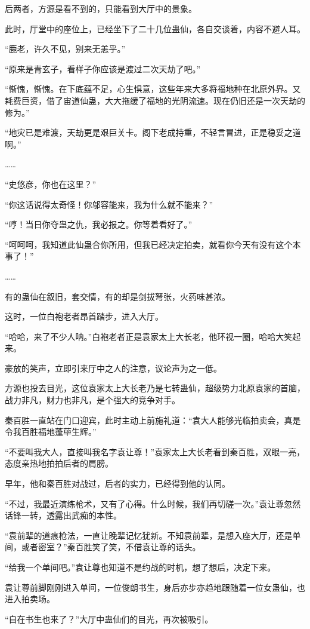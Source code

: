 \begin{this_body}
后两者，方源是看不到的，只能看到大厅中的景象。

此时，厅堂中的座位上，已经坐下了二十几位蛊仙，各自交谈着，内容不避人耳。

“鹿老，许久不见，别来无恙乎。”

“原来是青玄子，看样子你应该是渡过二次天劫了吧。”

“惭愧，惭愧。在下底蕴不足，心生惧意，这些年来大多将福地种在北原外界。又耗费巨资，借了宙道仙蛊，大大拖缓了福地的光阴流速。现在仍旧还是一次天劫的修为。”

“地灾已是难渡，天劫更是艰巨关卡。阁下老成持重，不轻言冒进，正是稳妥之道啊。”

……

“史悠彦，你也在这里？”

“你这话说得太奇怪！你邬容能来，我为什么就不能来？”

“哼！当日你夺蛊之仇，我必报之。你等着看好了。”

“呵呵呵，我知道此仙蛊合你所用，但我已经决定拍卖，就看你今天有没有这个本事了！”

……

有的蛊仙在叙旧，套交情，有的却是剑拔弩张，火药味甚浓。

这时，一位白袍老者昂首踏步，进入大厅。

“哈哈，来了不少人呐。”白袍老者正是袁家太上大长老，他环视一圈，哈哈大笑起来。

豪放的笑声，立即引来厅中之人的注意，议论声为之一低。

方源也投去目光，这位袁家太上大长老乃是七转蛊仙，超级势力北原袁家的首脑，战力非凡，财力也非凡，是个强大的竞争对手。

秦百胜一直站在门口迎宾，此时主动上前施礼道：“袁大人能够光临拍卖会，真是令我百胜福地蓬荜生辉。”

“不要叫我大人，直接叫我名字袁让尊！”袁家太上大长老看到秦百胜，双眼一亮，态度亲热地拍拍后者的肩膀。

早年，他和秦百胜对战过，后者的实力，已经得到他的认同。

“不过，我最近演练枪术，又有了心得。什么时候，我们再切磋一次。”袁让尊忽然话锋一转，透露出武痴的本性。

“袁前辈的道痕枪法，一直让晚辈记忆犹新。不知袁前辈，是想入座大厅，还是单间，或者密室？”秦百胜笑了笑，不借袁让尊的话头。

“给我一个单间吧。”袁让尊也知道不是约战的时机，想了想后，决定下来。

袁让尊前脚刚刚进入单间，一位俊朗书生，身后亦步亦趋地跟随着一位女蛊仙，也进入拍卖场。

“自在书生也来了？”大厅中蛊仙们的目光，再次被吸引。


\end{this_body}
